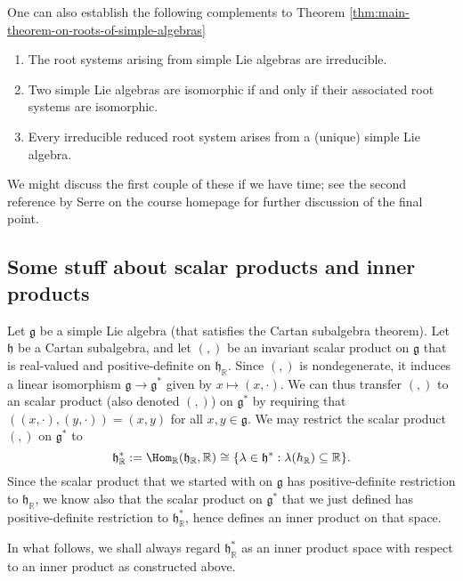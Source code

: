 \documentclass[reqno]{amsart} 
\begin{document}
\begin{remark}
  One can also establish the following complements to Theorem \ref{thm:main-theorem-on-roots-of-simple-algebras}
  \begin{enumerate}
  \item The root systems arising from simple Lie algebras are irreducible.
  \item Two simple Lie algebras are isomorphic if and only if their associated root systems are isomorphic.
  \item Every irreducible reduced root system arises from a (unique) simple Lie algebra.
  \end{enumerate}
  We might discuss the first couple of these if we have time; see the second reference by Serre on the course homepage for further discussion of the final point.
\end{remark}

\subsection{Some stuff about scalar products and inner products\label{sec:some-stuff-about-scalar-products}}
\label{sec:org3ce571d}
Let $\mathfrak{g}$ be a simple Lie algebra (that satisfies the Cartan subalgebra theorem).  Let $\mathfrak{h}$ be a Cartan subalgebra, and let $(,)$ be an invariant scalar product on $\mathfrak{g}$ that is real-valued and positive-definite on $\mathfrak{h}_\mathbb{R}$.  Since $(,)$ is nondegenerate, it induces a linear isomorphism $\mathfrak{g} \rightarrow \mathfrak{g}^*$ given by $x \mapsto (x,\cdot)$.  We can thus transfer $(,)$ to an scalar product (also denoted $(,)$) on $\mathfrak{g}^*$ by requiring that $((x,\cdot),(y,\cdot)) = (x,y)$ for all $x,y \in \mathfrak{g}$.  We may restrict the scalar product $(,)$ on $\mathfrak{g}^*$ to
\begin{equation*}
  \mathfrak{h}_\mathbb{R}^* := \Hom_\mathbb{R}(\mathfrak{h}_\mathbb{R},\mathbb{R}) \cong \{\lambda \in \mathfrak{h}^* : \lambda(h_\mathbb{R}) \subseteq \mathbb{R}\}.
\end{equation*}
Since the scalar product that we started with on $\mathfrak{g}$ has positive-definite restriction to $\mathfrak{h}_\mathbb{R}$, we know also that the scalar product on $\mathfrak{g}^*$ that we just defined has positive-definite restriction to $\mathfrak{h}_\mathbb{R}^*$, hence defines an inner product on that space.

In what follows, we shall always regard $\mathfrak{h}_\mathbb{R}^*$ as an inner product space with respect to an inner product as constructed above.
\end{document}

